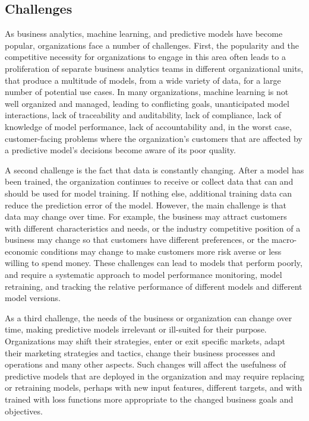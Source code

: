 \subsection*{Challenges}

As business analytics, machine learning, and predictive models have become popular, organizations face a number of challenges. First, the popularity and the competitive necessity for organizations to engage in this area often leads to a proliferation of separate business analytics teams in different organizational units, that produce a multitude of models, from a wide variety of data, for a large number of potential use cases. In many organizations, machine learning is not well organized and managed, leading to conflicting goals, unanticipated model interactions, lack of traceability and auditability, lack of compliance, lack of knowledge of model performance, lack of accountability and, in the worst case, customer-facing problems where the organization's customers that are affected by a predictive model's decisions become aware of its poor quality. 

A second challenge is the fact that data is constantly changing. After a model has been trained, the organization continues to receive or collect data that can and should be used for model training. If nothing else, additional training data can reduce the prediction error of the model. However, the main challenge is that data may change over time. For example, the business may attract customers with different characteristics and needs, or the industry competitive position of a business may change so that customers have different preferences, or the macro-economic conditions may change to make customers more risk averse or less willing to spend money. These challenges can lead to models that perform poorly, and require a systematic approach to model performance monitoring, model retraining, and tracking the relative performance of different models and different model versions.

As a third challenge, the needs of the business or organization can change over time, making predictive models irrelevant or ill-suited for their purpose. Organizations may shift their strategies, enter or exit specific markets, adapt their marketing strategies and tactics, change their business processes and operations and many other aspects. Such changes will affect the usefulness of predictive models that are deployed in the organization and may require replacing or retraining models, perhaps with new input features, different targets, and with trained with loss functions more appropriate to the changed business goals and objectives. 


